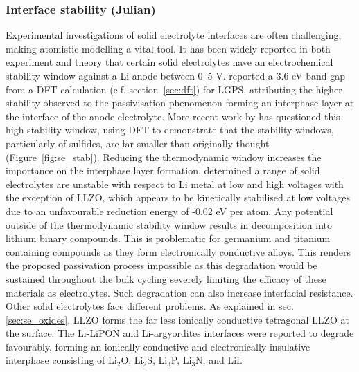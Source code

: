 \documentclass[../main.tex]{subfiles}
\begin{document}
\subsubsection{Interface stability (Julian)}
\label{sec:interface_stability}
Experimental investigations of solid electrolyte interfaces are often challenging, making atomistic modelling a vital tool.\cite{Xu2018exp} It has been widely reported in both experiment\cite{Liu2013, Han2015} and theory\cite{Mo2012} that certain solid electrolytes have an electrochemical stability window against a Li anode between 0--5 V.\cite{Kamaya2011, Thangadurai2005, Liu2013} \citeauthor{Mo2012} reported a 3.6 eV band gap from a DFT calculation (c.f. section~\ref{sec:dft}) for LGPS,\cite{Mo2012} attributing the higher stability observed to the passivisation phenomenon forming an interphase layer at the interface of the anode-electrolyte.\cite{Kobayashi2008} More recent work by \citeauthor{Zhu2015} has questioned this high stability window, using DFT to demonstrate that the stability windows, particularly of sulfides, are far smaller than originally thought (Figure~\ref{fig:se_stab}).\cite{Zhu2015} Reducing the thermodynamic window increases the importance on the interphase layer formation. \citeauthor{Zhu2015} determined a range of solid electrolytes are unstable with respect to Li metal at low and high voltages with the exception of LLZO, which appears to be kinetically stabilised at low voltages due to an unfavourable reduction energy of -0.02 eV per atom. Any potential outside of the thermodynamic stability window results in decomposition into lithium binary compounds. This is problematic for germanium and titanium containing compounds as they form electronically conductive alloys.\cite{Zhu2015} This renders the proposed passivation process impossible\cite{Mo2012, Zhu2015} as this degradation would be sustained throughout the bulk cycling severely limiting the efficacy of these materials as electrolytes. Such degradation can also increase interfacial resistance\cite{Takada2008, Sakuda2010}. Other solid electrolytes face different problems. As explained in sec. \ref{sec:se_oxides}, LLZO forms the far less ionically conductive tetragonal LLZO at the surface. The Li-LiPON and Li-argyordites interfaces were reported to degrade favourably, forming an ionically conductive and electronically insulative interphase consisting of Li$_2$O, Li$_2$S, Li$_3$P, Li$_3$N, and LiI.\cite{Zhu2015} 
\end{document}
